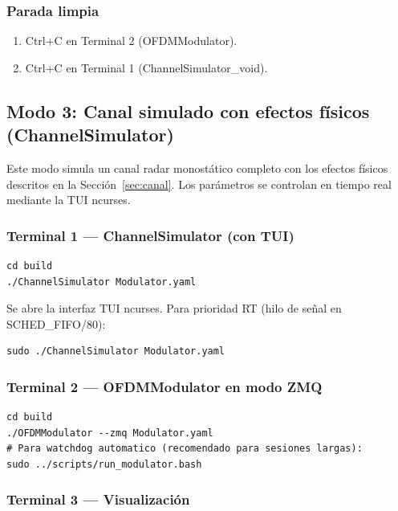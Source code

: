 \documentclass[11pt,a4paper]{article}
\begin{document}
\subsubsection{Parada limpia}

\begin{enumerate}
  \item Ctrl+C en Terminal 2 (OFDMModulator).
  \item Ctrl+C en Terminal 1 (ChannelSimulator\_void).
\end{enumerate}

\subsection{Modo 3: Canal simulado con efectos físicos (ChannelSimulator)}
\label{sec:modo_channel}

Este modo simula un canal radar monostático completo con los efectos físicos
descritos en la Sección~\ref{sec:canal}. Los parámetros se controlan en tiempo
real mediante la TUI ncurses.

\subsubsection{Terminal 1 — ChannelSimulator (con TUI)}

\begin{lstlisting}[style=bash]
cd build
./ChannelSimulator Modulator.yaml
\end{lstlisting}

Se abre la interfaz TUI ncurses. Para prioridad RT (hilo de señal en SCHED\_FIFO/80):

\begin{lstlisting}[style=bash]
sudo ./ChannelSimulator Modulator.yaml
\end{lstlisting}

\subsubsection{Terminal 2 — OFDMModulator en modo ZMQ}

\begin{lstlisting}[style=bash]
cd build
./OFDMModulator --zmq Modulator.yaml
# Para watchdog automatico (recomendado para sesiones largas):
sudo ../scripts/run_modulator.bash
\end{lstlisting}

\subsubsection{Terminal 3 — Visualización}
\end{document}
